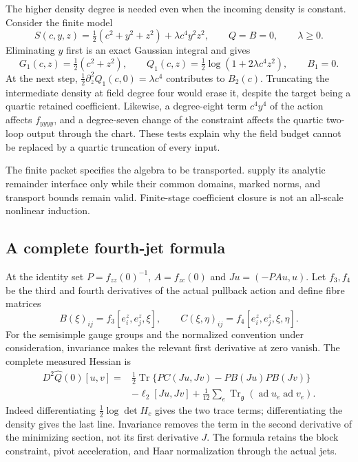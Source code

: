 \documentclass[11pt,oneside,openany]{book}
\theoremstyle{definition}
\theoremstyle{remark}
\newcommand{\Tr}{\operatorname{Tr}}
\newcommand{\src}[2]{\cite[#2]{#1}}
\begin{document}
The higher density degree is needed even when the incoming density
is constant. Consider the finite model
\[
 S(c,y,z)=\tfrac12(c^2+y^2+z^2)+\lambda c^4y^2z^2,
 \qquad Q=B=0,\qquad \lambda\ge0.
\]
Eliminating $y$ first is an exact Gaussian integral and gives
\[
 G_1(c,z)=\tfrac12(c^2+z^2),\qquad
 Q_1(c,z)=\tfrac12\log(1+2\lambda c^4z^2),\qquad B_1=0.
\]
At the next step, $\tfrac12\partial_z^2Q_1(c,0)=\lambda c^4$
contributes to $B_2(c)$. Truncating the intermediate density at
field degree four would erase it, despite the target being a quartic
retained coefficient. Likewise, a degree-eight term $c^4y^4$ of
the action affects $f_{yyyy}$, and a degree-seven change of the
constraint affects the quartic two-loop output through the chart.
These tests explain why the field budget cannot be replaced by a
quartic truncation of every input. \src{SM}{V8}

The finite packet specifies the algebra to be transported.
 supply its
analytic remainder interface only while their common domains,
marked norms, and transport bounds remain valid. Finite-stage
coefficient closure is not an all-scale nonlinear induction.

\subsection{A complete fourth-jet formula}
At the identity set $P=f_{zz}(0)^{-1}$, $A=f_{zc}(0)$ and
$Ju=(-PAu,u)$. Let $f_3,f_4$ be the third and fourth derivatives of
the actual pullback action and define fibre matrices
\[
 B(\xi)_{ij}=f_3[e_i^z,e_j^z,\xi],\qquad
 C(\xi,\eta)_{ij}=f_4[e_i^z,e_j^z,\xi,\eta].
\]
For the semisimple gauge groups and the normalized convention under
consideration, invariance makes the relevant first derivative at zero
vanish. The complete measured Hessian is
\begin{equation}\label{eq:complete-fourth-jet}
\begin{split}
 D^2\widehat Q(0)[u,v]={}&\tfrac12\Tr\{P C(Ju,Jv)
                       -P B(Ju)P B(Jv)\}\\
 &-\ell_2[Ju,Jv]
       +\tfrac1{12}\sum_e\Tr_{\mathfrak g}
                       (\operatorname{ad}u_e\operatorname{ad}v_e).
\end{split}
\end{equation}
Indeed differentiating $\tfrac12\log\det H_c$ gives the two trace
terms; differentiating the density gives the last line. Invariance
removes the term in the second derivative of the minimizing section,
not its first derivative $J$. The formula retains the block constraint,
pivot acceleration, and Haar normalization through the actual jets.
\src{F11}{V91--V93}
\end{document}
